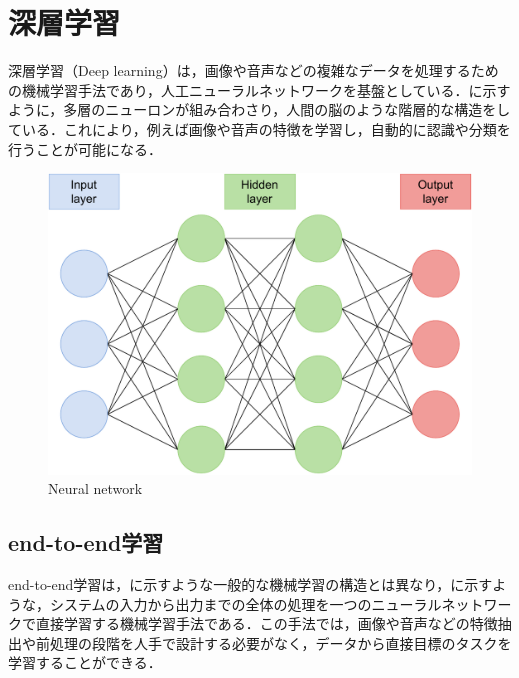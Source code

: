 
\section{深層学習}

  深層学習（Deep learning）は，画像や音声などの複雑なデータを処理するための機械学習手法であり，人工ニューラルネットワークを基盤としている．に示すように，多層のニューロンが組み合わさり，人間の脳のような階層的な構造をしている．これにより，例えば画像や音声の特徴を学習し，自動的に認識や分類を行うことが可能になる．

  \begin{figure}[h]
    \centering
    \includegraphics[keepaspectratio, scale=0.45] {images/pdf/deep_neural_network}
    \caption{Neural network}
    \label{Fig:deep_neural_network}
  \end{figure}

\newpage

\subsection{end-to-end学習}

  end-to-end学習は，に示すような一般的な機械学習の構造とは異なり，に示すような，システムの入力から出力までの全体の処理を一つのニューラルネットワークで直接学習する機械学習手法である．この手法では，画像や音声などの特徴抽出や前処理の段階を人手で設計する必要がなく，データから直接目標のタスクを学習することができる．

  \vspace{0.5cm}

